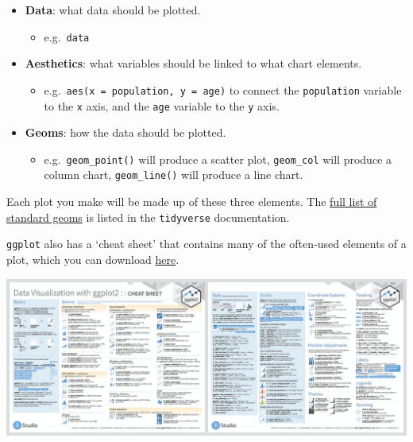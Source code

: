 \documentclass[]{book}
\providecommand{\tightlist}{%
  \setlength{\itemsep}{0pt}\setlength{\parskip}{0pt}}
\begin{document}
\begin{itemize}
\tightlist
\item
  \textbf{Data}: what data should be plotted.

  \begin{itemize}
  \tightlist
  \item
    e.g.~\texttt{data}
  \end{itemize}
\item
  \textbf{Aesthetics}: what variables should be linked to what chart elements.

  \begin{itemize}
  \tightlist
  \item
    e.g.~\texttt{aes(x\ =\ population,\ y\ =\ age)} to connect the \texttt{population} variable to the \texttt{x} axis, and the \texttt{age} variable to the \texttt{y} axis.
  \end{itemize}
\item
  \textbf{Geoms}: how the data should be plotted.

  \begin{itemize}
  \tightlist
  \item
    e.g.~\texttt{geom\_point()} will produce a scatter plot, \texttt{geom\_col} will produce a column chart, \texttt{geom\_line()} will produce a line chart.
  \end{itemize}
\end{itemize}

Each plot you make will be made up of these three elements. The \href{https://ggplot2.tidyverse.org/reference/}{full list of standard geoms} is listed in the \texttt{tidyverse} documentation.

\texttt{ggplot} also has a `cheat sheet' that contains many of the often-used elements of a plot, which you can download \href{https://github.com/rstudio/cheatsheets/raw/master/data-visualization-2.1.pdf}{here}.

\begin{center}\includegraphics[width=17.08in]{atlas/ggplot_cheat_sheet} \end{center}
\end{document}
